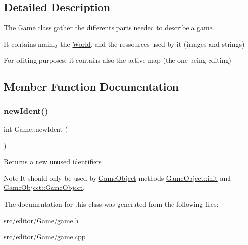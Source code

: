 \subsection{Detailed Description}
The \hyperlink{class_game}{Game} class gather the differents parts needed to describe a game. 

It contains mainly the \hyperlink{class_world}{World}, and the ressources used by it (images and strings)

For editing purposes, it contains also the active map (the one being editing) 

\subsection{Member Function Documentation}
\hypertarget{class_game_aeed0ba100700fb2f5d701fcf14d8871e}{}\label{class_game_aeed0ba100700fb2f5d701fcf14d8871e} 
\subsubsection{\texorpdfstring{new\+Ident()}{newIdent()}}
{\footnotesize\ttfamily int Game\+::new\+Ident (\begin{DoxyParamCaption}{ }\end{DoxyParamCaption})\hspace{0.3cm}{\ttfamily [inline]}}

Returns a new unused identifiers

\begin{DoxyNote}{Note}
It should only be used by \hyperlink{class_game_object}{Game\+Object} methods \hyperlink{class_game_object_a97be7b59b2e76e7d60de2146b894eed9}{Game\+Object\+::init} and \hyperlink{class_game_object_ab00c537faf6eb4439c60003141a763b9}{Game\+Object\+::\+Game\+Object}. 
\end{DoxyNote}


The documentation for this class was generated from the following files\+:\begin{DoxyCompactItemize}
\item 
src/editor/\+Game/\hyperlink{game_8h}{game.\+h}\item 
src/editor/\+Game/game.\+cpp\end{DoxyCompactItemize}
